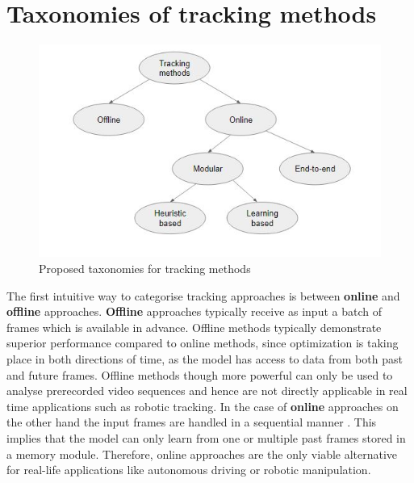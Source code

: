 \section{Taxonomies of tracking methods}\label{seq:taxonomies}

\begin{figure}
    \centering
    \includegraphics[]{figures/02_review/taxonomies.jpg}
    \caption{Proposed taxonomies for tracking methods}
    \label{fig:taxonomies}
\end{figure} 

The first intuitive way to categorise tracking approaches is between \textbf{online} and \textbf{offline} approaches. \textbf{Offline} approaches typically receive as input a batch of frames which is available in advance. Offline methods typically demonstrate superior performance compared to online methods, since optimization is taking place in both directions of time, as the model has access to data from both past and future frames. Offline methods though more powerful can only be used to analyse prerecorded video sequences and hence are not directly applicable in real time applications such as robotic tracking. In the case of \textbf{online} approaches on the other hand the input frames are handled in a sequential manner \parencite{reviewTracking}. This implies that the model can only learn from one or multiple past frames stored in a memory module. Therefore, online approaches are the only viable alternative for real-life applications like autonomous driving or robotic manipulation. \par

